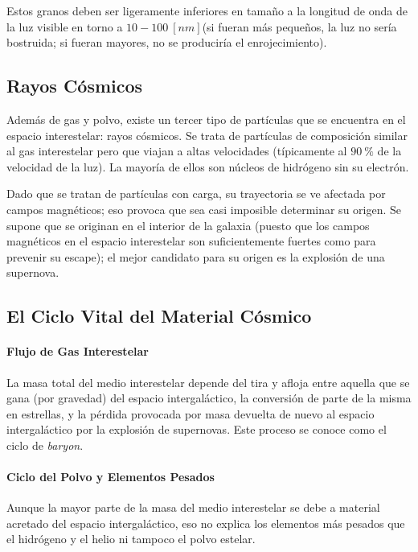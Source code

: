 \documentclass{tufte-handout}
\begin{document}
Estos granos deben ser ligeramente inferiores en tamaño a la longitud de onda de la luz visible en torno a $10-100~[nm]$(si fueran más pequeños, la luz no sería bostruida; si fueran mayores, no se produciría el enrojecimiento).

\subsection{Rayos Cósmicos}

Además de gas y polvo, existe un tercer tipo de partículas que se encuentra en el espacio interestelar: rayos cósmicos. Se trata de partículas de composición similar al gas interestelar pero que viajan a altas velocidades (típicamente al $90~\%$ de la velocidad de la luz). La mayoría de ellos son núcleos de hidrógeno sin su electrón.

Dado que se tratan de partículas con carga, su trayectoria se ve afectada por campos magnéticos; eso provoca que sea casi imposible determinar su origen. Se supone que se originan en el interior de la galaxia (puesto que los campos magnéticos en el espacio interestelar son suficientemente fuertes como para prevenir su escape); el mejor candidato para su origen es la explosión de una supernova.

\subsection{El Ciclo Vital del Material Cósmico}

\paragraph{Flujo de Gas Interestelar}

La masa total del medio interestelar depende del tira y afloja entre aquella que se gana (por gravedad) del espacio intergaláctico, la conversión de parte de la misma en estrellas, y la pérdida provocada por masa devuelta de nuevo al espacio intergaláctico por la explosión de supernovas. Este proceso se conoce como el ciclo de \emph{baryon}.

\paragraph{Ciclo del Polvo y Elementos Pesados}

Aunque la mayor parte de la masa del medio interestelar se debe a material acretado del espacio intergaláctico, eso no explica los elementos más pesados que el hidrógeno y el helio ni tampoco el polvo estelar.
\end{document}
